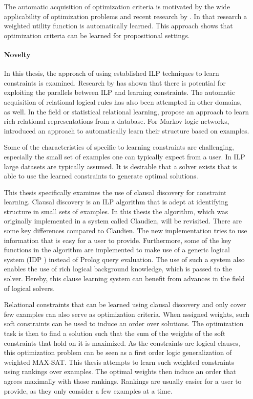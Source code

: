 The automatic acquisition of optimization criteria is motivated by the wide applicability of optimization problems and recent research by \cite{campigotto2011active}.
In that research a weighted utility function is automatically learned.
This approach shows that optimization criteria can be learned for propositional settings.

\paragraph{Novelty}
In this thesis, the approach of using established ILP techniques to learn constraints is examined. Research by \cite{Lallouet:LearningCP} has shown that there is potential for exploiting the parallels between ILP and learning constraints.
The automatic acquisition of relational logical rules has also been attempted in other domains, as well.
In the field or statistical relational learning, \cite{popescul2003statistical} propose an approach to learn rich relational representations from a database.
For Markov logic networks, \cite{kok2005learning} introduced an approach to automatically learn their structure based on examples.

Some of the characteristics of specific to learning constraints are challenging, especially the small set of examples one can typically expect from a user.
In ILP large datasets are typically assumed.
It is desirable that a solver exists that is able to use the learned constraints to generate optimal solutions.

This thesis specifically examines the use of clausal discovery \cite{DeRaedt:ClausalDiscovery} for constraint learning.
Clausal discovery is an ILP algorithm that is adept at identifying structure in small sets of examples. In this thesis the algorithm, which was originally implemented in a system called Claudien, will be revisited. There are some key differences compared to Claudien. The new implementation tries to use information that is easy for a user to provide. Furthermore, some of the key functions in the algorithm are implemented to make use of a generic logical system (IDP \cite{wittocx2008idp,de2013prototype}) instead of Prolog query evaluation. The use of such a system also enables the use of rich logical background knowledge, which is passed to the solver. Hereby, this clause learning system can benefit from advances in the field of logical solvers.

Relational constraints that can be learned using clausal discovery and only cover few examples can also serve as optimization criteria.
When assigned weights, such soft constraints can be used to induce an order over solutions.
The optimization task is then to find a solution such that the sum of the weights of the soft constraints that hold on it is maximized.
As the constraints are logical clauses, this optimization problem can be seen as a first order logic generalization of weighted MAX-SAT.
This thesis attempts to learn such weighted constraints using rankings over examples.
The optimal weights then induce an order that agrees maximally with those rankings.
Rankings are usually easier for a user to provide, as they only consider a few examples at a time.

